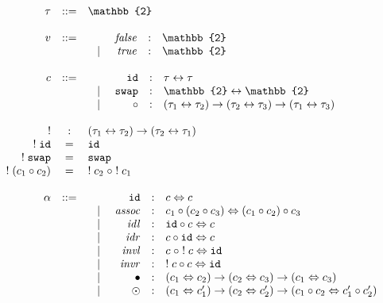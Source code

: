 \documentclass[format=acmlarge,review,natbib]{acmart}
\newcommand{\swap}{\texttt{swap}}
\newcommand{\id}{\texttt{id}}
\newcommand{\compc}[2]{#1 \circ #2}
\newcommand{\alt}{~\mid~}
\newcommand{\invc}[1]{!\;#1}
\newcommand{\assocc}{\mathit{assoc}}
\newcommand{\invl}{\mathit{invl}}
\newcommand{\invr}{\mathit{invr}}
\newcommand{\idlc}{\mathit{idl}}
\newcommand{\idrc}{\mathit{idr}}
\newcommand{\iso}{\leftrightarrow}
\newcommand{\isotwo}{\Leftrightarrow}
\newcommand{\bt}{\mathbb{2}}
\newcommand{\fc}{\mathit{false}}
\newcommand{\tc}{\mathit{true}}
\begin{document}
\[\begin{array}{rcl}
\tau &::=& \bt \\
\\
v &::=& \begin{array}[t]{lrcl}
                    & \fc &:& \bt \\
              \alt & \tc &:& \bt
               \end{array} \\
\\
c &::=& \begin{array}[t]{lrcl}
              & \id &:& \tau \iso \tau \\
               \alt & \swap &:& \bt \iso \bt \\
               \alt & \circ &:& (\tau_1 \iso \tau_2) \to (\tau_2 \iso \tau_3)
                              \to (\tau_1 \iso \tau_3)
               \end{array} \\
\\
! &:& (\tau_1 \iso \tau_2) \to (\tau_2 \iso \tau_1) \\
\invc{\id} &=& \id \\
\invc{\swap} &=& \swap \\
\invc{(\compc{c_1}{c_2})} &=& \compc{\invc{c_2}\;}{\;\invc{c_1}} \\
\\
\alpha &::=& \begin{array}[t]{lrcl}
               & \id &:& c \isotwo c \\
               \alt & \assocc &:& \compc{c_1}{(\compc{c_2}{c_3})} \isotwo
                                              \compc{(\compc{c_1}{c_2})}{c_3} \\
               \alt & \idlc &:& \compc{\id}{c} \isotwo c \\
               \alt & \idrc &:& \compc{c}{\id} \isotwo c \\
               \alt & \invl &:& \compc{c\;}{\;\invc{c}} \isotwo \id \\
               \alt & \invr &:& \compc{\invc{c}}{c} \isotwo \id \\
               \alt & \bullet &:& (c_1 \isotwo c_2) \to (c_2 \isotwo c_3)
                                            \to (c_1 \isotwo c_3) \\
               \alt & \odot &:& (c_1 \isotwo c_1') \to (c_2 \isotwo c_2')
                                            \to (\compc{c_1}{c_2} \isotwo \compc{c_1'}{c_2'}) \\
             \end{array}
\end{array}\]
\end{document}
